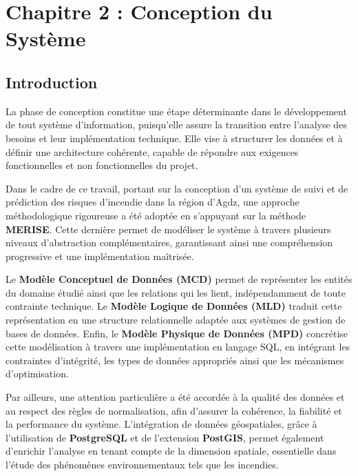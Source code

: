 \documentclass[12pt,a4paper]{report}
\begin{document}
\chapter*{Chapitre 2 : Conception du Système}
\setcounter{chapter}{2}
\setcounter{section}{0}
\setcounter{figure}{0}
\setcounter{table}{0}

\section*{Introduction}

La phase de conception constitue une étape déterminante dans le développement de tout système d'information, puisqu'elle assure la transition entre l'analyse des besoins et leur implémentation technique. Elle vise à structurer les données et à définir une architecture cohérente, capable de répondre aux exigences fonctionnelles et non fonctionnelles du projet.

Dans le cadre de ce travail, portant sur la conception d'un système de suivi et de prédiction des risques d'incendie dans la région d'Agdz, une approche méthodologique rigoureuse a été adoptée en s'appuyant sur la méthode \textbf{MERISE}. Cette dernière permet de modéliser le système à travers plusieurs niveaux d'abstraction complémentaires, garantissant ainsi une compréhension progressive et une implémentation maîtrisée.

Le \textbf{Modèle Conceptuel de Données (MCD)} permet de représenter les entités du domaine étudié ainsi que les relations qui les lient, indépendamment de toute contrainte technique. Le \textbf{Modèle Logique de Données (MLD)} traduit cette représentation en une structure relationnelle adaptée aux systèmes de gestion de bases de données. Enfin, le \textbf{Modèle Physique de Données (MPD)} concrétise cette modélisation à travers une implémentation en langage SQL, en intégrant les contraintes d'intégrité, les types de données appropriés ainsi que les mécanismes d'optimisation.

Par ailleurs, une attention particulière a été accordée à la qualité des données et au respect des règles de normalisation, afin d'assurer la cohérence, la fiabilité et la performance du système. L'intégration de données géospatiales, grâce à l'utilisation de \textbf{PostgreSQL} et de l'extension \textbf{PostGIS}, permet également d'enrichir l'analyse en tenant compte de la dimension spatiale, essentielle dans l'étude des phénomènes environnementaux tels que les incendies.
\end{document}
